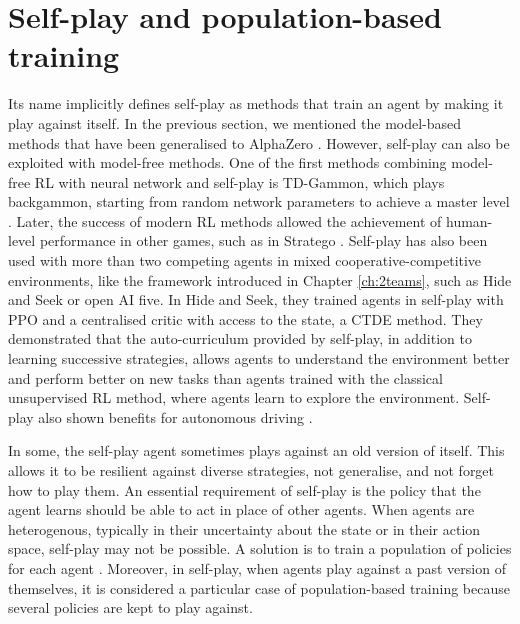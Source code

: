 \section{Self-play and population-based training}\label{sec:ch6_algo}
Its name implicitly defines self-play as methods that train an agent by making it play against itself.
In the previous section, we mentioned the model-based methods that have been generalised to AlphaZero \citep{silver2018general}.
However, self-play can also be exploited with model-free methods.
One of the first methods combining model-free RL with neural network and self-play is TD-Gammon, which plays backgammon, starting from random network parameters to achieve a master level \citep{tesauro1994td}.
Later, the success of modern RL methods allowed the achievement of human-level performance in other games, such as in Stratego \citep{stratego}.
Self-play has also been used with more than two competing agents in mixed cooperative-competitive environments, like the framework introduced in Chapter \ref{ch:2teams}, such as Hide and Seek \citep{baker2019emergent} or open AI five.
In Hide and Seek, they trained agents in self-play with PPO and a centralised critic with access to the state, a CTDE method.
They demonstrated that the auto-curriculum provided by self-play, in addition to learning successive strategies, allows agents to understand the environment better and perform better on new tasks than agents trained with the classical unsupervised RL method, where agents learn to explore the environment.
Self-play also shown benefits for autonomous driving \citep{cornelisse2024humancompatible}.

In some, the self-play agent sometimes plays against an old version of itself.
This allows it to be resilient against diverse strategies, not generalise, and not forget how to play them.
An essential requirement of self-play is the policy that the agent learns should be able to act in place of other agents.
When agents are heterogenous, typically in their uncertainty about the state or in their action space, self-play may not be possible.
A solution is to train a population of policies for each agent \citep{jaderberg2017population}.
Moreover, in self-play, when agents play against a past version of themselves, it is considered a particular case of population-based training because several policies are kept to play against.

